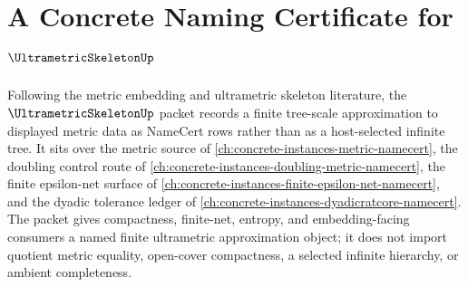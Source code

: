 \chapter{A Concrete Naming Certificate for $\UltrametricSkeletonUp$}
\label{ch:concrete-instances-ultrametric-skeleton-namecert}

Following the metric embedding and ultrametric skeleton literature, the $\UltrametricSkeletonUp$ packet records a finite tree-scale approximation to displayed metric data as NameCert rows rather than as a host-selected infinite tree. It sits over the metric source of \autoref{ch:concrete-instances-metric-namecert}, the doubling control route of \autoref{ch:concrete-instances-doubling-metric-namecert}, the finite epsilon-net surface of \autoref{ch:concrete-instances-finite-epsilon-net-namecert}, and the dyadic tolerance ledger of \autoref{ch:concrete-instances-dyadicratcore-namecert}. The packet gives compactness, finite-net, entropy, and embedding-facing consumers a named finite ultrametric approximation object; it does not import quotient metric equality, open-cover compactness, a selected infinite hierarchy, or ambient completeness.

